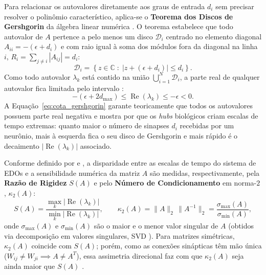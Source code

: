 \documentclass[12pt,a4paper]{article}
\begin{document}
Para relacionar os autovalores diretamente aos graus de entrada $d_i$ sem precisar resolver o polinômio característico, aplica-se o \textbf{Teorema dos Discos de Gershgorin} da álgebra linear numérica \cite{burden2016,strang1997}. O teorema estabelece que todo autovalor de $A$ pertence a pelo menos um disco $\mathcal{D}_i$ centrado no elemento diagonal $A_{ii} = -(\epsilon + d_i)$ e com raio igual à soma dos módulos fora da diagonal na linha $i$, $R_i = \sum_{j \neq i} |A_{ij}| = d_i$:
\begin{equation}
    \mathcal{D}_i = \left\{ z \in \mathbb{C} \;:\; \left| z + (\epsilon + d_i) \right| \le d_i \right\}.
    \label{eq:disco_gershgorin}
\end{equation}
Como todo autovalor $\lambda_k$ está contido na união $\bigcup_{i=1}^N \mathcal{D}_i$, a parte real de qualquer autovalor fica limitada pelo intervalo \cite{burden2016}:
\begin{equation}
    -(\epsilon + 2d_{\max}) \le \operatorname{Re}(\lambda_k) \le -\epsilon < 0.
    \label{eq:cota_gershgorin}
\end{equation}
A Equação~\eqref{eq:cota_gershgorin} garante teoricamente que todos os autovalores possuem parte real negativa e mostra por que os \textit{hubs} biológicos criam escalas de tempo extremas: quanto maior o número de sinapses $d_i$ recebidas por um neurônio, mais à esquerda fica o seu disco de Gershgorin e mais rápido é o decaimento $|\operatorname{Re}(\lambda_k)|$ associado.

Conforme definido por  e , a disparidade entre as escalas de tempo do sistema de EDOs e a sensibilidade numérica da matriz $A$ são medidas, respectivamente, pela \textbf{Razão de Rigidez} $S(A)$ e pelo \textbf{Número de Condicionamento} em norma-$2$, $\kappa_2(A)$:
\begin{equation}
    S(A) = \frac{\max_{k} |\operatorname{Re}(\lambda_k)|}{\min_{k} |\operatorname{Re}(\lambda_k)|}, \qquad
    \kappa_2(A) = \|A\|_2\,\|A^{-1}\|_2 = \frac{\sigma_{\max}(A)}{\sigma_{\min}(A)},
    \label{eq:rigidez_condicionamento}
\end{equation}
onde $\sigma_{\max}(A)$ e $\sigma_{\min}(A)$ são o maior e o menor valor singular de $A$ (obtidos via decomposição em valores singulares, SVD \cite{strang1997}). Para matrizes simétricas, $\kappa_2(A)$ coincide com $S(A)$; porém, como as conexões sinápticas têm mão única ($W_{ij} \neq W_{ji} \implies A \neq A^T$), essa assimetria direcional faz com que $\kappa_2(A)$ seja ainda maior que $S(A)$ \cite{strang1997}.
\end{document}
